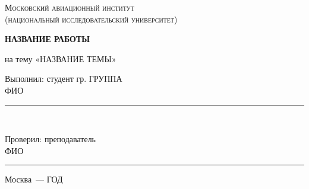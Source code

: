 \begin{titlepage}

\begin{center}
    \textsc{Московский авиационный институт \\ (национальный исследовательский университет)}\\
\end{center}

\begin{center}
    \vspace{5.5cm}
    
    \setlength{\parskip}{16pt}
    \textbf{НАЗВАНИЕ РАБОТЫ} 
    
    на тему {«НАЗВАНИЕ ТЕМЫ»} \\[8.5cm]
\end{center} 

\setlength{\parskip}{12pt}
\begin{flushright}
    Выполнил: студент гр. {ГРУППА} \\ {ФИО}

    \noindent\rule{6cm}{0.4pt} \\[1.5cm]
    
\end{flushright}

\begin{flushright}
    Проверил: преподаватель \\ {ФИО}
    
    \noindent\rule{6cm}{0.4pt}
\end{flushright}

\vfill 

\begin{center} 
    {Москва~--- ГОД}
\end{center} 

\thispagestyle{empty}

\end{titlepage}